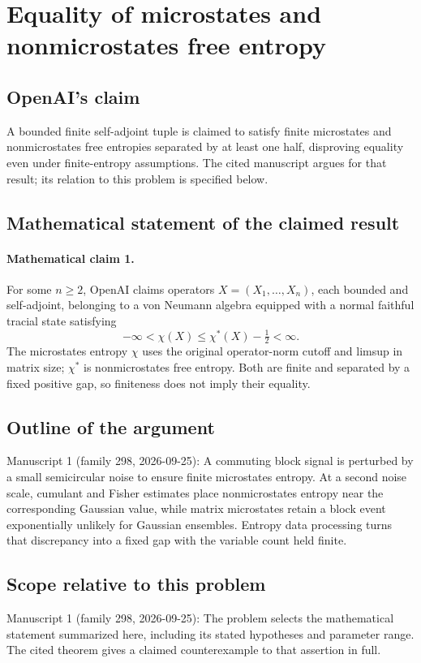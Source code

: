 \documentclass[11pt]{article}
\begin{document}
\section*{Equality of microstates and nonmicrostates free entropy}

\subsection{OpenAI's claim}
A bounded finite self-adjoint tuple is claimed to satisfy finite microstates and nonmicrostates free entropies separated by at least one half, disproving equality even under finite-entropy assumptions. The cited manuscript argues for that result; its relation to this problem is specified below.

\subsection{Mathematical statement of the claimed result}
\paragraph{Mathematical claim 1.} For some $n\ge2$, OpenAI claims operators $X=(X_1,\ldots,X_n)$, each bounded and self-adjoint, belonging to a von Neumann algebra equipped with a normal faithful tracial state satisfying
\[
-\infty<\chi(X)\le\chi^*(X)-\tfrac12<\infty.
\]
The microstates entropy $\chi$ uses the original operator-norm cutoff and limsup in matrix size; $\chi^*$ is nonmicrostates free entropy. Both are finite and separated by a fixed positive gap, so finiteness does not imply their equality.

\subsection{Outline of the argument}
Manuscript 1 (family 298, 2026-09-25): A commuting block signal is perturbed by a small semicircular noise to ensure finite microstates entropy. At a second noise scale, cumulant and Fisher estimates place nonmicrostates entropy near the corresponding Gaussian value, while matrix microstates retain a block event exponentially unlikely for Gaussian ensembles. Entropy data processing turns that discrepancy into a fixed gap with the variable count held finite.

\subsection{Scope relative to this problem}
Manuscript 1 (family 298, 2026-09-25): The problem selects the mathematical statement summarized here, including its stated hypotheses and parameter range. The cited theorem gives a claimed counterexample to that assertion in full.
\end{document}
